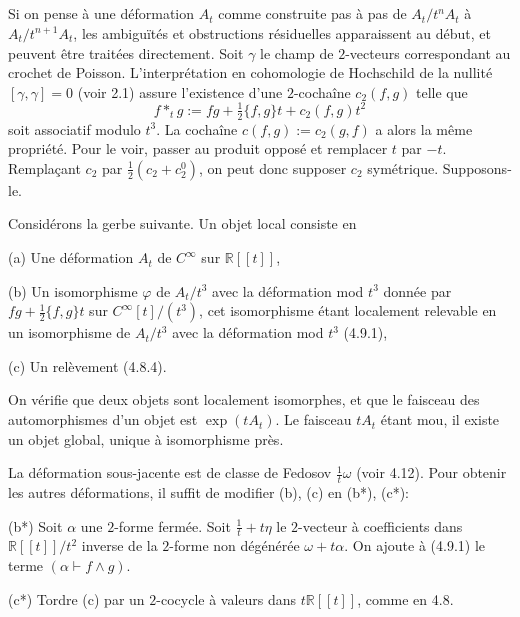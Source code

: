 \documentclass[11pt,a4paper]{article}
\theoremstyle{plain}
\theoremstyle{definition}
\newcommand{\R}{\mathbb{R}}
\begin{document}
\subsection{}
Si on pense \`a une d\'eformation $A_{t}$ comme construite pas \`a pas de $A_{t}/t^{n}A_{t}$
\`a $A_{t}/t^{n+1}A_{t}$, les ambigu\"it\'es et obstructions r\'esiduelles apparaissent au d\'ebut, et
peuvent \^etre trait\'ees directement. Soit $\gamma$ le champ de $2$-vecteurs correspondant
au crochet de Poisson. L'interpr\'etation en cohomologie de Hochschild de la nullit\'e
$[\gamma, \gamma] = 0$ (voir 2.1) assure l'existence d'une $2$-cocha\^ine $c_{2}(f, g)$ telle que
\begin{equation}
f *_{t} g := fg + \tfrac{1}{2}\{f,g\}t + c_{2}(f,g)t^{2} \tag{4.9.1}
\end{equation}
soit associatif modulo $t^{3}$. La cocha\^ine $c(f,g) := c_{2}(g, f)$ a alors la m\^eme propri\'et\'e.
Pour le voir, passer au produit oppos\'e et remplacer $t$ par $-t$. Rempla\c{c}ant $c_{2}$ par
$\tfrac{1}{2}(c_{2} + c_{2}^{0})$, on peut donc supposer $c_{2}$ sym\'etrique. Supposons-le.

Consid\'erons la gerbe suivante. Un objet local consiste en

(a) Une d\'eformation $A_{t}$ de $C^{\infty}$ sur $\R[[t]]$,

(b) Un isomorphisme $\varphi$ de $A_{t}/t^{3}$ avec la d\'eformation mod $t^{3}$ donn\'ee par $fg + \tfrac{1}{2}\{f,g\}t$ sur $C^{\infty}[t]/(t^{3})$, cet isomorphisme \'etant localement relevable en un isomorphisme de $A_{t}/t^{3}$ avec la d\'eformation mod $t^{3}$ (4.9.1),

(c) Un rel\`evement (4.8.4).

On v\'erifie que deux objets sont localement isomorphes, et que le faisceau des automorphismes d'un objet est $\exp(tA_{t})$. Le faisceau $tA_{t}$ \'etant mou, il existe un
objet global, unique \`a isomorphisme pr\`es.

La d\'eformation sous-jacente est de classe de Fedosov $\frac{1}{t}\omega$ (voir 4.12). Pour obtenir les autres d\'eformations, il suffit de modifier (b), (c) en (b*), (c*):

(b*) Soit $\alpha$ une $2$-forme ferm\'ee. Soit $\tfrac{1}{t} + t\eta$ le $2$-vecteur \`a coefficients dans $\R[[t]]/t^{2}$ inverse de la $2$-forme non d\'eg\'en\'er\'ee $\omega + t\alpha$. On ajoute \`a (4.9.1) le terme $(\alpha \vdash f \wedge g)$.

(c*) Tordre (c) par un $2$-cocycle \`a valeurs dans $t\R[[t]]$, comme en 4.8.
\end{document}
